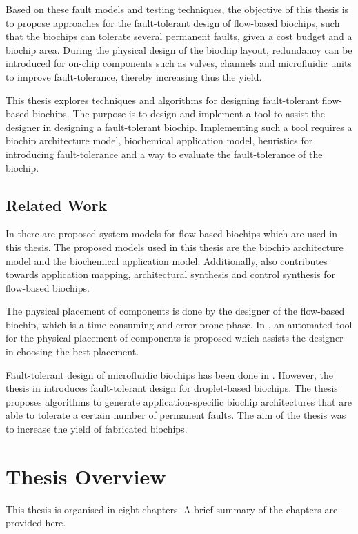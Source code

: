 Based on these fault models and testing techniques, the objective of this thesis is to propose approaches for the fault-tolerant design of flow-based biochips, such that the biochips can tolerate several permanent faults, given a cost budget and a biochip area. During the physical design of the biochip layout, redundancy can be introduced for on-chip components such as valves, channels and microfluidic units to improve fault-tolerance, thereby increasing thus the yield.

This thesis explores techniques and algorithms for designing fault-tolerant flow-based biochips. The purpose is to design and implement a tool to assist the designer in designing a fault-tolerant biochip. Implementing such a tool requires a biochip architecture model, biochemical application model, heuristics for introducing fault-tolerance and a way to evaluate the fault-tolerance of the biochip.

\subsection{Related Work}
In \cite{wajid} there are proposed system models for flow-based biochips which are used in this thesis. The proposed models used in this thesis are the biochip architecture model and the biochemical application model. Additionally, \cite{wajid} also contributes towards application mapping, architectural synthesis and control synthesis for flow-based biochips.

The physical placement of components is done by the designer of the flow-based biochip, which is a time-consuming and error-prone phase. In \cite{michael}, an automated tool for the physical placement of components is proposed which assists the designer in choosing the best placement.

Fault-tolerant design of microfluidic biochips has been done in \cite{mirela}. However, the thesis in \cite{mirela} introduces fault-tolerant design for droplet-based biochips. The thesis proposes algorithms to generate application-specific biochip architectures that are able to tolerate a certain number of permanent faults. The aim of the thesis was to increase the yield of fabricated biochips.


\section{Thesis Overview}
This thesis is organised in eight chapters. A brief summary of the chapters are provided here.

